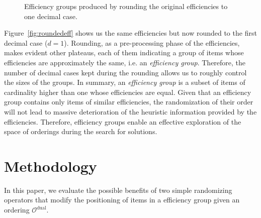 \documentclass[3p,authoryear]{elsarticle}
\newcommand{\Ord}{\mathcal{O}}
\begin{document}
\begin{figure}[h!]
	\centering
	\caption{Efficiency groups produced by rounding the original efficiencies to one decimal case.}
\end{figure}


Figure~\ref{fig:roundedeff} shows us the same efficiencies but now rounded to the first decimal case ($d=1$). Rounding, as a pre-processing phase of the efficiencies, makes evident other plateaus, each of them indicating a group of items whose efficiencies are approximately the same, i.e. an \textit{efficiency group}. Therefore, the number of decimal cases kept during the rounding allows us to roughly control the sizes of the groups. In summary, an \textit{efficiency group} is a subset of items of cardinality higher than one whose efficiencies are equal. Given that an efficiency group contains only items of similar efficiencies, the randomization of their order will not lead to massive deterioration of the heuristic information provided by the efficiencies. Therefore, efficiency groups enable an effective exploration of the space of orderings during the search for solutions. 


\section{Methodology}\label{sec:methodology}

In this paper, we evaluate the possible benefits of two simple randomizing operators that modify the positioning of items in a efficiency group given an ordering $\Ord^\text{dual}$.
\end{document}

